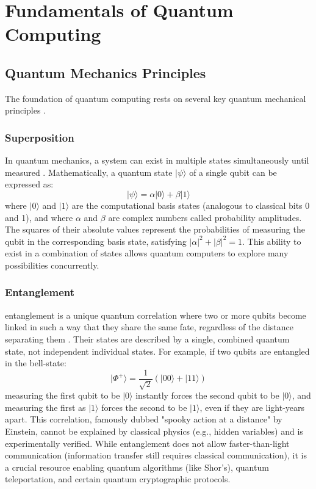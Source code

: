 \chapter{Fundamentals of Quantum Computing}\label{chap:fundamentals}

\section{Quantum Mechanics Principles}\label{sec:quantum_principles}
The foundation of quantum computing rests on several key quantum mechanical principles \parencite{votatera2024quantum, sepQM2025, wikipedia2025quantum}.

\subsection{Superposition}\label{subsec:superposition}
In quantum mechanics, a system can exist in multiple states simultaneously until measured \parencite{Thomson2025LiveScienceSuperposition, KyrlynnD2024SuperpositionHow}. Mathematically, a quantum state $|\psi\rangle$ of a single \gls{qubit} can be expressed as:
\begin{equation}\label{eq:superposition}
    |\psi\rangle = \alpha|0\rangle + \beta|1\rangle
\end{equation}
where $|0\rangle$ and $|1\rangle$ are the computational basis states (analogous to classical bits 0 and 1), and where $\alpha$ and $\beta$ are complex numbers called probability amplitudes. The squares of their absolute values represent the probabilities of measuring the qubit in the corresponding basis state, satisfying $|\alpha|^2 + |\beta|^2 = 1$. This ability to exist in a combination of states allows quantum computers to explore many possibilities concurrently.

\subsection{Entanglement}\label{subsec:entanglement}
\Gls{entanglement} is a unique quantum correlation where two or more qubits become linked in such a way that they share the same fate, regardless of the distance separating them \parencite{Ding2007EntanglementReview}. Their states are described by a single, combined quantum state, not independent individual states. For example, if two qubits are entangled in the \gls{bell-state}:
\begin{equation*}
    |\Phi^+\rangle = \frac{1}{\sqrt{2}}(|00\rangle + |11\rangle)
\end{equation*}
measuring the first \gls{qubit} to be $|0\rangle$ instantly forces the second \gls{qubit} to be $|0\rangle$, and measuring the first as $|1\rangle$ forces the second to be $|1\rangle$, even if they are light-years apart. This correlation, famously dubbed "spooky action at a distance" by Einstein, cannot be explained by classical physics (e.g., hidden variables) and is experimentally verified. While entanglement does not allow faster-than-light communication (information transfer still requires classical communication), it is a crucial resource enabling quantum algorithms (like Shor's), quantum teleportation, and certain quantum cryptographic protocols.

